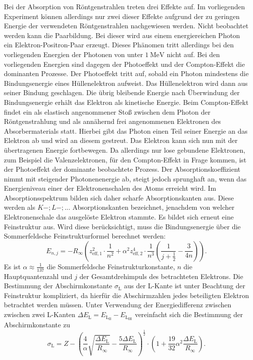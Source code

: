 Bei der Absorption von Röntgenstrahlen treten drei Effekte auf. Im vorliegenden Experiment können allerdings nur zwei dieser Effekte aufgrund der zu geringen Energie der verwendeten Röntgenstrahlen nachgewiesen werden.
Nicht beobachtet werden kann die Paarbildung. Bei dieser wird aus einem energiereichen Photon ein Elektron-Positron-Paar erzeugt. Dieses Phänomen tritt allerdings bei den vorliegenden Energien der Photonen von unter $\SI{1}{\mega\electronvolt}$ nicht auf.
Bei den vorliegenden Energien sind dagegen der Photoeffekt und der Compton-Effekt die dominanten Prozesse.
Der Photoeffekt tritt auf, sobald ein Photon mindestens die Bindungsenergie eines Hüllenelektron aufweist.
Das Hüllenelektron wird dann aus seiner Bindung geschlagen. Die übrig bleibende Energie nach Überwindung der Bindungsenergie erhält das Elektron als kinetische Energie.
Beim Compton-Effekt findet ein als elastisch angenommener Stoß zwischen dem Photon der Röntgenstrahlung und als annähernd frei angenommenen Elektronen des Absorbermaterials statt.
Hierbei gibt das Photon einen Teil seiner Energie an das Elektron ab und wird an diesem gestreut.
Das Elektron kann sich nun mit der übertragenen Energie fortbewegen.
Da allerdings nur lose gebundene Elektronen, zum Beispiel die Valenzelektronen, für den Compton-Effekt in Frage kommen, ist der Photoeffekt der dominante beobachtete Prozess.
Der Absorptionskoeffizient nimmt mit steigender Photonenenergie ab, steigt jedoch sprunghaft an, wenn das Energieniveau einer der Elektronenschalen des Atoms erreicht wird.
Im Absorptionsspektrum bilden sich daher scharfe Absorptionskanten aus. Diese werden als $K-;L-;...$ Absorptionskanten bezeichnet, jenachdem von welcher Elektronenschale das ausgelöste Elektron stammte.
Es bildet sich erneut eine Feinstruktur aus. Wird diese berücksichtigt, muss die Bindungsenergie über die Sommerfeldsche Feinstrukturformel berechnet werden:
\begin{equation}
  E_{n,j}=-R_\infty  \left(z_\mathrm{eff,1}^2 \cdot \frac{1}{n^2}+\alpha^2 z_\mathrm{eff,2}^4 \cdot \frac{1}{n^3}\left(\frac{1}{j+\frac{1}{2}}-\frac{3}{4n}\right)\right)\text{.}
\end{equation}
Es ist $\alpha \approx \frac{1}{137}$ die Sommerfeldsche Feinstrukturkonstante, $n$ die Hauptquantenzahl und $j$ der Gesamtdrehimpuls des betrachteten Elektrons.
Die Bestimmung der Abschirmkonstante $\sigma_\mathrm{L}$ aus der L-Kante ist unter Beachtung der Feinstruktur kompliziert, da hierfür die Abschirmzahlen jedes beteiligten Elektron betrachtet werden müssen.
Unter Verwendung der Energiedifferenz zwischen zwischen zwei L-Kanten $\Delta E_\mathrm{L}=E_\mathrm{L_\mathrm{II}}-E_\mathrm{L_\mathrm{III}}$ vereinfacht sich die Bestimmung der Abschirmkonstante zu
\begin{equation}
	\label{eqn:goldi}
  \sigma_{\mathrm{L}}=Z-\left(\frac{4}{\alpha}\sqrt{\frac{\Delta E_\mathrm{L}}{R_\infty}}-\frac{5\Delta E_\mathrm{L}}{R_\infty}\right)^{\frac{1}{2}}\cdot \left(1+\frac{19}{32}\alpha^2\frac{\Delta E_\mathrm{L}}{R_\infty}\right) \text{.}
\end{equation}

